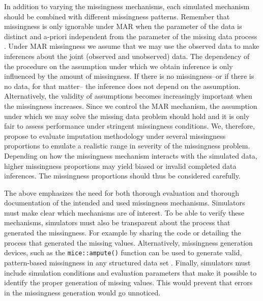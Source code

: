 \documentclass[bimj,fleqn]{w-art}
\begin{document}
In addition to varying the missingness mechanisms, each simulated mechanism should be combined with different missingness patterns. Remember that missingness is only ignorable under MAR when the parameter of the data is distinct and a-priori independent from the parameter of the missing data process \citep[Corollary 6.1A]{litt20}. Under MAR missingness we assume that we may use the observed data to make inferences about the joint (observed and unobserved) data. The dependency of the procedure on the assumption under which we obtain inference is only influenced by the amount of missingness. If there is no missingness--or if there is no data, for that matter-- the inference does not depend on the assumption. Alternatively, the validity of assumptions becomes increasingly important when the missingness increases. Since we control the MAR mechanism, the assumption under which we may solve the missing data problem should hold and it is only fair to assess performance under stringent missingness conditions. We, therefore, propose to evaluate imputation methodology under several missingness proportions to emulate a realistic range in severity of the missingness problem. Depending on how the missingness mechanism interacts with the simulated data, higher missingness proportions may yield biased or invalid completed data inferences. The missingness proportions should thus be considered carefully.

The above emphasizes the need for both thorough evaluation and thorough documentation of the intended and used missingness mechanisms. Simulators must make clear which mechanisms are of interest. To be able to verify these mechanisms, simulators must also be transparent about the process that generated the missingness. For example by sharing the code or detailing the process that generated the missing values. Alternatively, missingness generation devices, such as the \texttt{mice::ampute()} function can be used to generate valid, pattern-based missingness in any structured data set \citep{mice, ampute}. Finally, simulators must include simulation conditions and evaluation parameters that make it possible to identify the proper generation of missing values. This would prevent that errors in the missingness generation would go unnoticed. 


\end{document}
